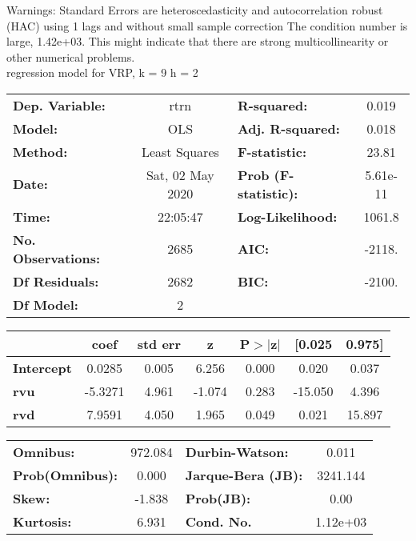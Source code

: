 Warnings: \newline
 [1] Standard Errors are heteroscedasticity and autocorrelation robust (HAC) using 1 lags and without small sample correction \newline
 [2] The condition number is large, 1.42e+03. This might indicate that there are \newline
 strong multicollinearity or other numerical problems.\\ 

regression model for VRP, k = 9 h = 2\begin{center}
\begin{tabular}{lclc}
\toprule
\textbf{Dep. Variable:}    &       rtrn       & \textbf{  R-squared:         } &     0.019   \\
\textbf{Model:}            &       OLS        & \textbf{  Adj. R-squared:    } &     0.018   \\
\textbf{Method:}           &  Least Squares   & \textbf{  F-statistic:       } &     23.81   \\
\textbf{Date:}             & Sat, 02 May 2020 & \textbf{  Prob (F-statistic):} &  5.61e-11   \\
\textbf{Time:}             &     22:05:47     & \textbf{  Log-Likelihood:    } &    1061.8   \\
\textbf{No. Observations:} &        2685      & \textbf{  AIC:               } &    -2118.   \\
\textbf{Df Residuals:}     &        2682      & \textbf{  BIC:               } &    -2100.   \\
\textbf{Df Model:}         &           2      & \textbf{                     } &             \\
\bottomrule
\end{tabular}
\begin{tabular}{lcccccc}
                   & \textbf{coef} & \textbf{std err} & \textbf{z} & \textbf{P$> |$z$|$} & \textbf{[0.025} & \textbf{0.975]}  \\
\midrule
\textbf{Intercept} &       0.0285  &        0.005     &     6.256  &         0.000        &        0.020    &        0.037     \\
\textbf{rvu}       &      -5.3271  &        4.961     &    -1.074  &         0.283        &      -15.050    &        4.396     \\
\textbf{rvd}       &       7.9591  &        4.050     &     1.965  &         0.049        &        0.021    &       15.897     \\
\bottomrule
\end{tabular}
\begin{tabular}{lclc}
\textbf{Omnibus:}       & 972.084 & \textbf{  Durbin-Watson:     } &    0.011  \\
\textbf{Prob(Omnibus):} &   0.000 & \textbf{  Jarque-Bera (JB):  } & 3241.144  \\
\textbf{Skew:}          &  -1.838 & \textbf{  Prob(JB):          } &     0.00  \\
\textbf{Kurtosis:}      &   6.931 & \textbf{  Cond. No.          } & 1.12e+03  \\
\bottomrule
\end{tabular}
\end{center}

